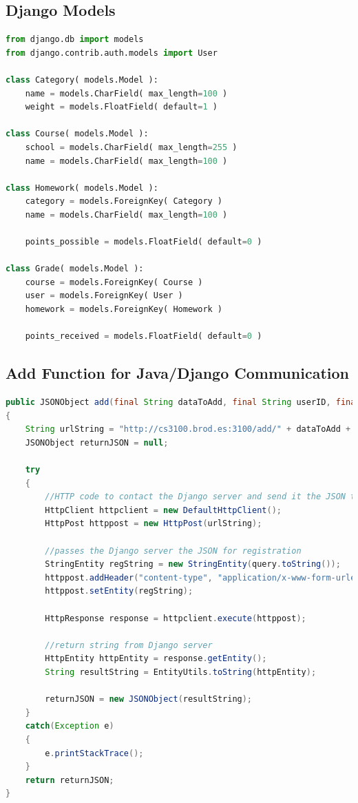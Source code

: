 \documentclass[a4paper]{article} %
\begin{document}
\subsection{Django Models} \label{Django Models} \linespread{1}

\begin{lstlisting}[language=Python]
from django.db import models
from django.contrib.auth.models import User

class Category( models.Model ):
    name = models.CharField( max_length=100 )
    weight = models.FloatField( default=1 )

class Course( models.Model ):
    school = models.CharField( max_length=255 )
    name = models.CharField( max_length=100 )

class Homework( models.Model ):
    category = models.ForeignKey( Category )
    name = models.CharField( max_length=100 )

    points_possible = models.FloatField( default=0 )

class Grade( models.Model ):
    course = models.ForeignKey( Course )
    user = models.ForeignKey( User )
    homework = models.ForeignKey( Homework )
    
    points_received = models.FloatField( default=0 )
\end{lstlisting}

\pagebreak
\subsection{Add Function for Java/Django Communication} \label{Jabba Code}
\begin{lstlisting}[language=Java]
public JSONObject add(final String dataToAdd, final String userID, final String token, JSONObject query)
{
    String urlString = "http://cs3100.brod.es:3100/add/" + dataToAdd + "/?user=" + userID + "&token=" + token;
    JSONObject returnJSON = null;

    try
    {
        //HTTP code to contact the Django server and send it the JSON to register
        HttpClient httpclient = new DefaultHttpClient();
        HttpPost httppost = new HttpPost(urlString);

        //passes the Django server the JSON for registration
        StringEntity regString = new StringEntity(query.toString());
        httppost.addHeader("content-type", "application/x-www-form-urlencoded");
        httppost.setEntity(regString);

        HttpResponse response = httpclient.execute(httppost);

        //return string from Django server
        HttpEntity httpEntity = response.getEntity();
        String resultString = EntityUtils.toString(httpEntity);

        returnJSON = new JSONObject(resultString);
    }
    catch(Exception e)
    {
        e.printStackTrace();
    }
    return returnJSON;
}
\end{lstlisting}
\end{document}
